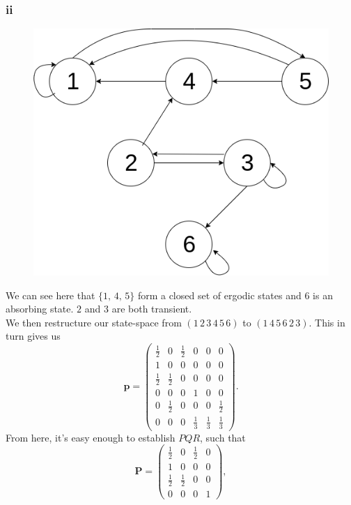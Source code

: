 \documentclass{article}
\begin{document}
\subsubsection{ii}
\begin{figure}[H]
    \centering
    \includegraphics[scale=0.3]{diagram2020.png}
    \label{fig:3aii}
\end{figure}
We can see here that $\{1,\,4,\,5\}$ form a closed set of ergodic states and $6$ is an absorbing state. $2$ and $3$ are both transient.\\
We then restructure our state-space from $(1\,2\,3\,4\,5\,6)$ to $(1\,4\,5\,6\,2\,3)$. This in turn gives us
\begin{equation}
    \mathbf{p} = \begin{pmatrix}
        \frac{1}{2} & 0 & \frac{1}{2} & 0 & 0 & 0 \\
        1 & 0 & 0 & 0 & 0 & 0 \\
        \frac{1}{2} & \frac{1}{2} & 0 & 0 & 0 & 0 \\
        0 & 0 & 0 & 1 & 0 & 0 \\
        0 & \frac{1}{2} & 0 & 0 & 0 & \frac{1}{2} \\
        0 & 0 & 0 & \frac{1}{3} & \frac{1}{3} & \frac{1}{3}
    \end{pmatrix}.
\end{equation}
From here, it's easy enough to establish $PQR$, such that
\begin{equation}
    \mathbf{P} = \begin{pmatrix}
        \frac{1}{2} & 0 & \frac{1}{2} & 0 \\
        1 & 0 & 0 & 0 \\
        \frac{1}{2} & \frac{1}{2} & 0 & 0 \\
        0 & 0 & 0 & 1
    \end{pmatrix},
\end{equation}
\end{document}
